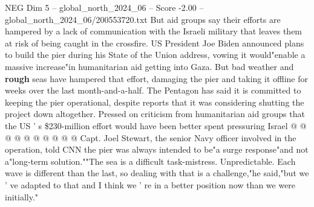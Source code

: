\begin{textsample}{NEG Dim 5 – global\_north\_2024\_06 – Score -2.00 – global\_north\_2024\_06/200553720.txt}
But aid groups say their efforts are hampered by a lack of communication with the Israeli military that leaves them at risk of being caught in the crossfire.
US President Joe Biden announced plans to build the pier during his State of the Union address, vowing it would"enable a massive increase"in humanitarian aid getting into Gaza.
But bad weather and \textbf{rough} seas have hampered that effort, damaging the pier and taking it offline for weeks over the last month-and-a-half.
The Pentagon has said it is committed to keeping the pier operational, despite reports that it was considering shutting the project down altogether.
Pressed on criticism from humanitarian aid groups that the US ' s \$230-million effort would have been better spent pressuring Israel @ @ @ @ @ @ @ @ @ @ Capt.
Joel Stewart, the senior Navy officer involved in the operation, told CNN the pier was always intended to be"a surge response"and not a"long-term solution.""The sea is a difficult task-mistress.
Unpredictable.
Each wave is different than the last, so dealing with that is a challenge,"he said,"but we ' ve adapted to that and I think we ' re in a better position now than we were initially."

\end{textsample}
